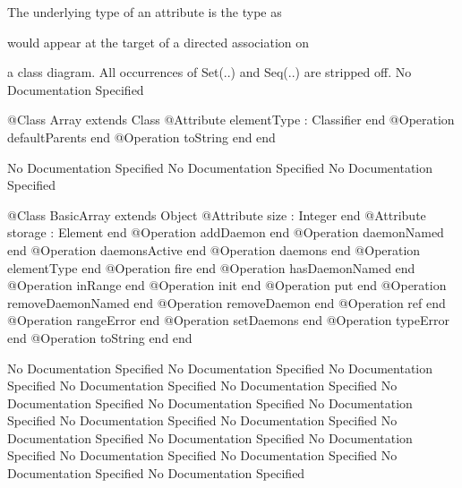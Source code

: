       The underlying type of an attribute is the type as

      would appear at the target of a directed association on

      a class diagram. All occurrences of Set(..) and Seq(..) 
      are stripped off.
No Documentation Specified
\begin{Interface}
@Class Array extends Class
  @Attribute elementType : Classifier end
  @Operation defaultParents end
  @Operation toString end
end
\end{Interface}
No Documentation Specified
No Documentation Specified
No Documentation Specified
\begin{Interface}
@Class BasicArray extends Object
  @Attribute size : Integer end
  @Attribute storage : Element end
  @Operation addDaemon end
  @Operation daemonNamed end
  @Operation daemonsActive end
  @Operation daemons end
  @Operation elementType end
  @Operation fire end
  @Operation hasDaemonNamed end
  @Operation inRange end
  @Operation init end
  @Operation put end
  @Operation removeDaemonNamed end
  @Operation removeDaemon end
  @Operation ref end
  @Operation rangeError end
  @Operation setDaemons end
  @Operation typeError end
  @Operation toString end
end
\end{Interface}
No Documentation Specified
No Documentation Specified
No Documentation Specified
No Documentation Specified
No Documentation Specified
No Documentation Specified
No Documentation Specified
No Documentation Specified
No Documentation Specified
No Documentation Specified
No Documentation Specified
No Documentation Specified
No Documentation Specified
No Documentation Specified
No Documentation Specified
No Documentation Specified
No Documentation Specified

